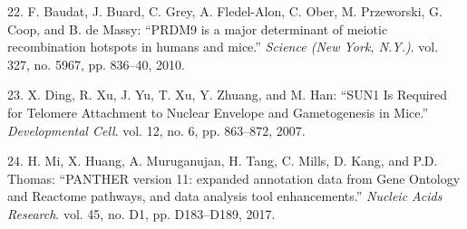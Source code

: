 \documentclass[12pt,twoside]{ugathesis}
\begin{document}
\hypertarget{ref-Baudat2010}{}
22. F. Baudat, J. Buard, C. Grey, A. Fledel-Alon, C. Ober, M.
Przeworski, G. Coop, and B. de Massy: ``PRDM9 is a major determinant of
meiotic recombination hotspots in humans and mice.'' \emph{Science (New
York, N.Y.)}. vol. 327, no. 5967, pp. 836--40, 2010.

\hypertarget{ref-Ding2007}{}
23. X. Ding, R. Xu, J. Yu, T. Xu, Y. Zhuang, and M. Han: ``SUN1 Is
Required for Telomere Attachment to Nuclear Envelope and Gametogenesis
in Mice.'' \emph{Developmental Cell}. vol. 12, no. 6, pp. 863--872,
2007.

\hypertarget{ref-Mi2017}{}
24. H. Mi, X. Huang, A. Muruganujan, H. Tang, C. Mills, D. Kang, and
P.D. Thomas: ``PANTHER version 11: expanded annotation data from Gene
Ontology and Reactome pathways, and data analysis tool enhancements.''
\emph{Nucleic Acids Research}. vol. 45, no. D1, pp. D183--D189, 2017.


\end{document}
